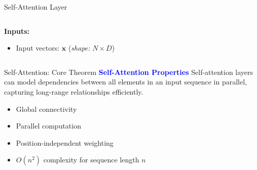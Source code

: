 \documentclass[serif, aspectratio=169]{beamer}
\begin{document}
\begin{frame}{Self-Attention Layer}
\begin{columns}
\begin{column}{0.58\textwidth}
			\textbf{Inputs:}
			\begin{itemize}
				\item Input vectors: $\mathbf{x}$ (\textit{shape: } $N \times D$)
			\end{itemize}
		\end{column}

	\end{columns}
\vspace{3pt}
\vfill
{}
\end{frame}

\begin{frame}{Self-Attention: Core Theorem}
    \textcolor{blue}{\textbf{Self-Attention Properties}}
    \newline
        Self-attention layers can model dependencies between all elements in an input sequence in parallel, capturing long-range relationships efficiently.

    \begin{itemize}
            \item Global connectivity
            \item Parallel computation
            \item Position-independent weighting
            \item $O(n^2)$ complexity for sequence length $n$
    \end{itemize}
\end{frame}

\end{document}
